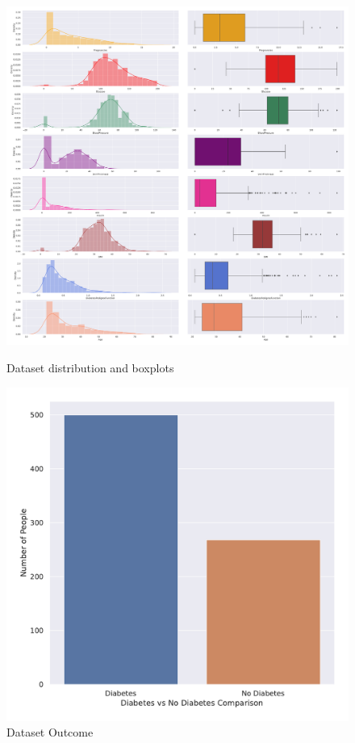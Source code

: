 \documentclass[11pt]{article}
\begin{document}
	\begin{figure}[H]
		\begin{minipage}[b]{0.7\textwidth}
			\centering
			\includegraphics[width=\textwidth]{img/dataset_distibutionAndBoxPlot.pdf}
			\caption{Dataset distribution and boxplots}
			\label{fig:distributionBoxplot}
		\end{minipage}
		\begin{minipage}[b]{0.3\textwidth}
			\centering
			\includegraphics[width=\textwidth]{img/dataset_diabetes_and_non_diabetes.pdf}
			\caption{Dataset Outcome}
			\label{fig:outcome}
		\end{minipage}
	\end{figure}
\end{document}
